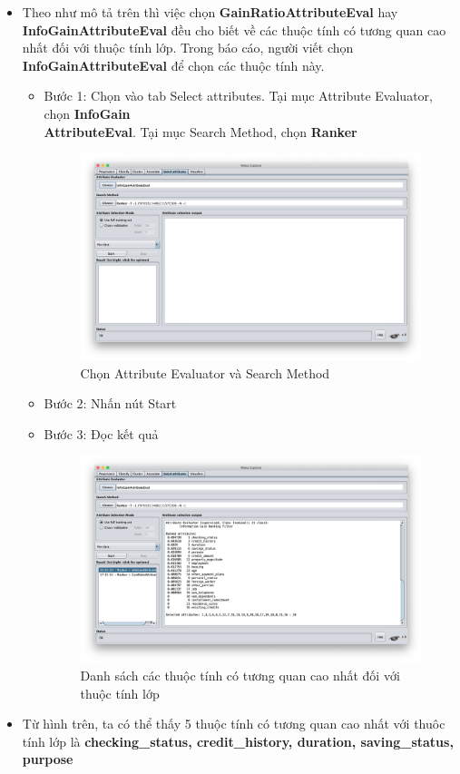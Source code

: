 \documentclass[a4paper, 12pt]{article}
\begin{document}
\begin{itemize}
    \item Theo như mô tả trên thì việc chọn \textbf{GainRatioAttributeEval} hay \textbf{InfoGainAttributeEval} đều cho biết về các thuộc tính có tương quan cao nhất đối với thuộc tính lớp. Trong báo cáo, người viết chọn \textbf{InfoGainAttributeEval} để chọn các thuộc tính này.
    \begin{itemize}
        \item Bước 1: Chọn vào tab Select attributes. Tại mục Attribute Evaluator, chọn \textbf{InfoGain\\AttributeEval}. Tại mục Search Method, chọn \textbf{Ranker}
        \begin{figure}[H]
            \begin{center}
                \includegraphics[scale = 0.35]{images/selectAttributeCreditG.png}
                \caption{Chọn Attribute Evaluator và Search Method}
            \end{center}
        \end{figure}
        \item Bước 2: Nhấn nút Start
        \item Bước 3: Đọc kết quả
        \begin{figure}[H]
            \begin{center}
                \includegraphics[scale = 0.35]{images/creditG_result.png}
                \caption{Danh sách các thuộc tính có tương quan cao nhất đối với thuộc tính lớp}
            \end{center}
        \end{figure}
    \end{itemize}

    \item Từ hình trên, ta có thể thấy 5 thuộc tính có tương quan cao nhất với thuôc tính lớp là \textbf{checking\_status, credit\_history, duration, saving\_status, purpose}
\end{itemize}
\end{document}
